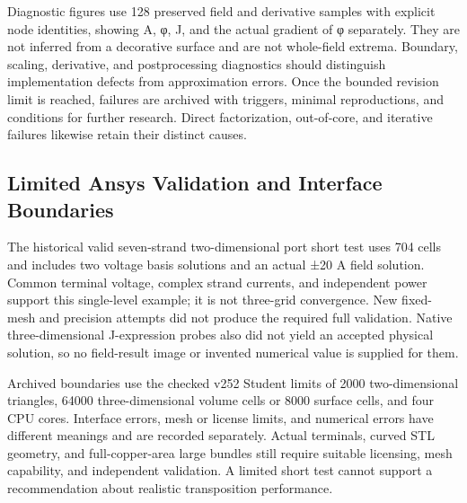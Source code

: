 \documentclass[11pt]{article}
\begin{document}
Diagnostic figures use 128 preserved field and derivative samples with explicit node identities, showing A, φ, J, and the actual gradient of φ separately. They are not inferred from a decorative surface and are not whole-field extrema. Boundary, scaling, derivative, and postprocessing diagnostics should distinguish implementation defects from approximation errors. Once the bounded revision limit is reached, failures are archived with triggers, minimal reproductions, and conditions for further research. Direct factorization, out-of-core, and iterative failures likewise retain their distinct causes.


\subsection*{Limited Ansys Validation and Interface Boundaries}
\hypertarget{S2.ansys.heading}{}
The historical valid seven-strand two-dimensional port short test uses 704 cells and includes two voltage basis solutions and an actual ±20 A field solution. Common terminal voltage, complex strand currents, and independent power support this single-level example; it is not three-grid convergence. New fixed-mesh and precision attempts did not produce the required full validation. Native three-dimensional J-expression probes also did not yield an accepted physical solution, so no field-result image or invented numerical value is supplied for them.


Archived boundaries use the checked v252 Student limits of 2000 two-dimensional triangles, 64000 three-dimensional volume cells or 8000 surface cells, and four CPU cores. Interface errors, mesh or license limits, and numerical errors have different meanings and are recorded separately. Actual terminals, curved STL geometry, and full-copper-area large bundles still require suitable licensing, mesh capability, and independent validation. A limited short test cannot support a recommendation about realistic transposition performance.
\end{document}
